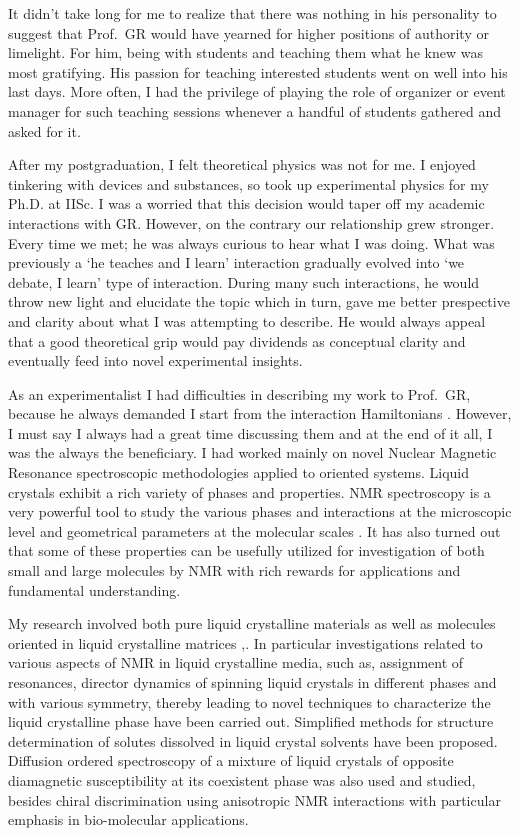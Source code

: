 It didn't take long for me to realize that there was nothing in his personality to
suggest that Prof.\ GR would have yearned for higher positions of authority or
limelight. For him, being with students and teaching them what he knew was most
gratifying. His passion for teaching interested students went on well into his last
days. More often, I had the privilege of playing the role of organizer or event
manager for such teaching sessions whenever a handful of students gathered and
asked for it.

After my postgraduation, I felt theoretical physics was not for me. I enjoyed
tinkering with devices and substances, so took up experimental physics for my
Ph.D. at IISc. I was a worried that this decision would taper off my academic
interactions with GR. However, on the contrary our relationship grew stronger.
Every time we met; he was always curious to hear what I was doing. What was
previously a `he teaches and I learn' interaction gradually evolved into `we
debate, I learn' type of interaction. During many such interactions, he would
throw new light and elucidate the topic which in turn, gave me better prespective
and clarity about what I was attempting to describe. He would always appeal that
a good theoretical grip would pay dividends as conceptual clarity and eventually
feed into novel experimental insights.

As an experimentalist I had difficulties in describing my work to Prof.\ GR,
because he always demanded I start from the interaction Hamiltonians \cite{chap31-key1}.
However, I must say I always had a great time discussing them and at the end of
it all, I was the always the beneficiary. I had worked mainly on novel Nuclear
Magnetic Resonance spectroscopic methodologies applied to oriented systems.
Liquid crystals exhibit a rich variety of phases and properties. NMR spectroscopy
is a very powerful tool to study the various phases and interactions at the
microscopic level and geometrical parameters at the molecular scales \cite{chap31-key2}. It has
also turned out that some of these properties can be usefully utilized for
investigation of both small and large molecules by NMR with rich rewards for
applications and fundamental understanding.

My research involved both pure liquid crystalline materials as well as molecules
oriented in liquid crystalline matrices \cite{chap31-key3},\cite{chap31-key16}. In particular investigations related
to various aspects of NMR in liquid crystalline media, such as, assignment of
resonances, director dynamics of spinning liquid crystals in different phases and
with various symmetry, thereby leading to novel techniques to characterize the
liquid crystalline phase have been carried out. Simplified methods for structure
determination of solutes dissolved in liquid crystal solvents have been proposed.
Diffusion ordered spectroscopy of a mixture of liquid crystals of opposite
diamagnetic susceptibility at its coexistent phase was also used and studied,
besides chiral discrimination using anisotropic NMR interactions with particular
emphasis in bio-molecular applications.

